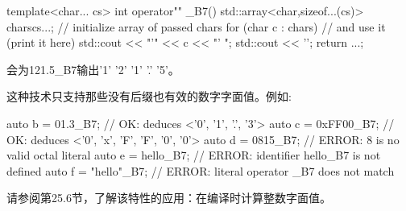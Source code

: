 \begin{cpp}
template<char... cs>
int operator"" _B7()
{
	std::array<char,sizeof...(cs)> chars{cs...}; // initialize array of passed chars
	for (char c : chars) { // and use it (print it here)
		std::cout << "’" << c << "’ ";
	}
	std::cout << ’\n’;
	return ...;
}
\end{cpp}

会为121.5\_B7输出'1' '2' '1' '.' '5'。

这种技术只支持那些没有后缀也有效的数字字面值。例如:

\begin{cpp}
auto b = 01.3_B7; // OK: deduces <’0’, ’1’, ’.’, ’3’>
auto c = 0xFF00_B7; // OK: deduces <’0’, ’x’, ’F’, ’F’, ’0’, ’0’>
auto d = 0815_B7; // ERROR: 8 is no valid octal literal
auto e = hello_B7; // ERROR: identifier hello_B7 is not defined
auto f = "hello"_B7; // ERROR: literal operator _B7 does not match
\end{cpp}

请参阅第25.6节，了解该特性的应用：在编译时计算整数字面值。






















